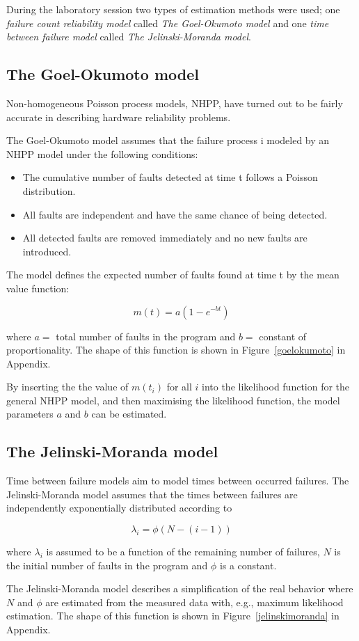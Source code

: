 During the laboratory session two types of estimation methods were used; one \textit{failure count reliability model} called \textit{The Goel-Okumoto model }and one \textit{time between failure model} called \textit{The Jelinski-Moranda model}. 

\subsection{The Goel-Okumoto model}
Non-homogeneous Poisson process models, NHPP, have turned out to be fairly accurate in describing hardware reliability problems. 

The Goel-Okumoto model assumes that the failure process i modeled by an NHPP model under the following conditions:
\begin{itemize}
\item	The cumulative number of faults detected at time t follows a Poisson distribution.
\item	All faults are independent and have the same chance of being detected.
\item 	All detected faults are removed immediately and no new faults are introduced.
\end{itemize}

\noindent The model defines the expected number of faults found at time t by the mean value function:

$$m(t) = a(1 - e^{-bt})$$

\noindent where $a=$ total number of faults in the program and $b=$ constant of proportionality. The shape of this function is shown in Figure~\ref{goelokumoto} in Appendix. 


\noindent By inserting the the value of $m(t_{i})$ for all $i$ into the likelihood function for the general NHPP model, and then maximising the likelihood function, the model parameters $a$ and $b$ can be estimated. 

\subsection{The Jelinski-Moranda model}
Time between failure models aim to model times between occurred failures. The Jelinski-Moranda model assumes that the times between failures are independently exponentially distributed according to 

$$\lambda_{i}=\phi(N-(i-1))$$

\noindent where $\lambda_{i}$ is assumed to be a function of the remaining number of failures, $N$ is the initial number of faults in the program and $\phi$ is a constant. 

The Jelinski-Moranda model describes a simplification of the real behavior where $N$ and $\phi$ are estimated from the measured data with, e.g., maximum likelihood estimation. The shape of this function is shown in Figure~\ref{jelinskimoranda} in Appendix. 
